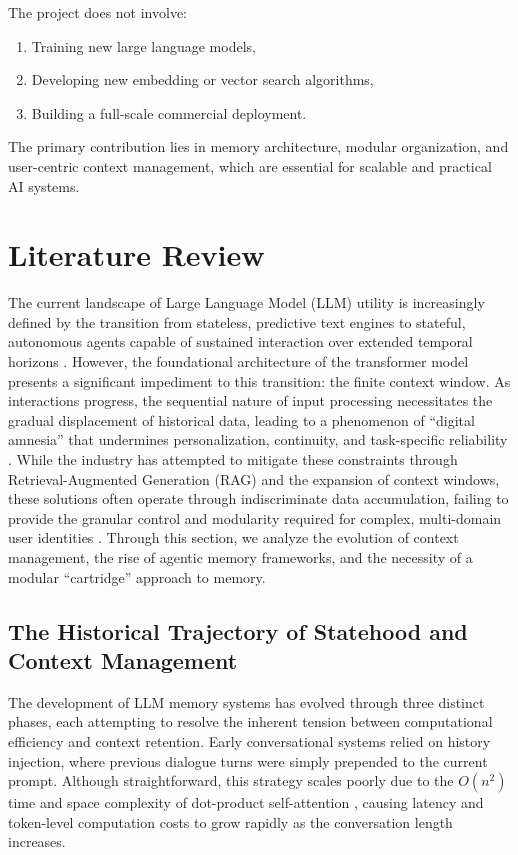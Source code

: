 ﻿\documentclass[12pt,a4paper]{article}
\begin{document}
The project does not involve:

\begin{enumerate}
    \item Training new large language models,
    
    \item Developing new embedding or vector search algorithms,
    
    \item Building a full-scale commercial deployment.
\end{enumerate}

The primary contribution lies in memory architecture, modular organization, and user-centric context management, which are essential for scalable and practical AI systems.

\section{Literature Review}

The current landscape of Large Language Model (LLM) utility is increasingly defined by the transition from stateless, predictive text engines to stateful, autonomous agents capable of sustained interaction over extended temporal horizons \cite{luo2025large}. However, the foundational architecture of the transformer model presents a significant impediment to this transition: the finite context window. As interactions progress, the sequential nature of input processing necessitates the gradual displacement of historical data, leading to a phenomenon of ``digital amnesia'' that undermines personalization, continuity, and task-specific reliability \cite{liu2024lost}. While the industry has attempted to mitigate these constraints through Retrieval-Augmented Generation (RAG) and the expansion of context windows, these solutions often operate through indiscriminate data accumulation, failing to provide the granular control and modularity required for complex, multi-domain user identities \cite{li2025memos}. Through this section, we analyze the evolution of context management, the rise of agentic memory frameworks, and the necessity of a modular ``cartridge'' approach to memory.

\subsection{The Historical Trajectory of Statehood and Context Management}

The development of LLM memory systems has evolved through three distinct phases, each attempting to resolve the inherent tension between computational efficiency and context retention. Early conversational systems relied on history injection, where previous dialogue turns were simply prepended to the current prompt. Although straightforward, this strategy scales poorly due to the $O(n^2)$ time and space complexity of dot-product self-attention \cite{vaswani2017attention}, causing latency and token-level computation costs to grow rapidly as the conversation length increases.
\end{document}
